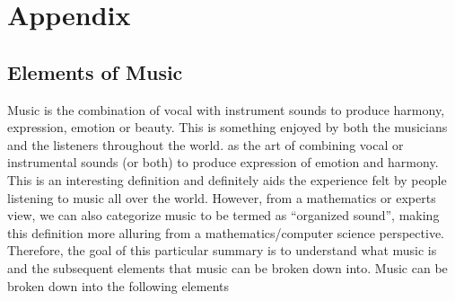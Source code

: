 
\chapter{Appendix}%
\label{sec:elements_of_music}

\section{Elements of Music}
Music is the combination of vocal with instrument sounds to produce harmony, expression, emotion or beauty. This is something enjoyed by both the musicians and the listeners throughout the world. as the art of combining vocal or instrumental sounds (or both) to produce expression of emotion and harmony. This is an interesting definition and definitely aids the experience felt by people listening to music all over the world. However, from a mathematics or experts view, we can also categorize music to be termed as “organized sound”, making this definition more alluring from a mathematics/computer science perspective. Therefore, the goal of this particular summary is to understand what music is and the subsequent elements that music can be broken down into. Music can be broken down into the following elements \cite{martineau2021elements}


